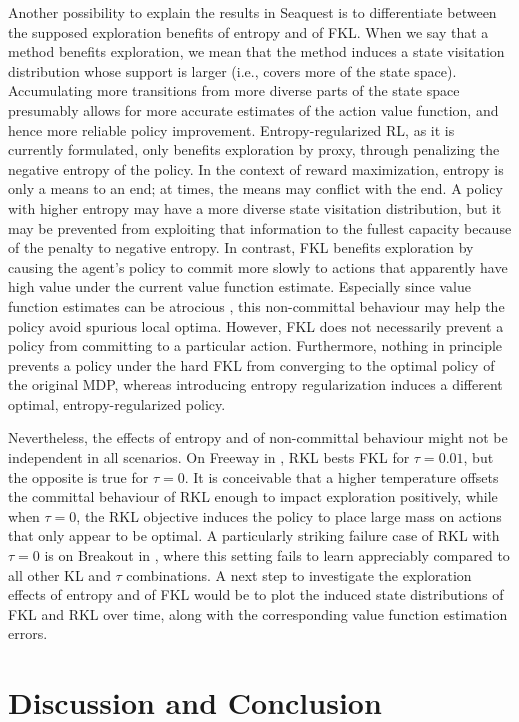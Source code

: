 \documentclass[twoside,11pt]{article}
\begin{document}
Another possibility to explain the results in Seaquest is to differentiate between the supposed exploration benefits of entropy and of FKL. When we say that a method benefits exploration, we mean that the method induces a state visitation distribution whose support is larger (i.e., covers more of the state space). Accumulating more transitions from more diverse parts of the state space presumably allows for more accurate estimates of the action value function, and hence more reliable policy improvement. Entropy-regularized RL, as it is currently formulated, only benefits exploration by proxy, through penalizing the negative entropy of the policy. In the context of reward maximization, entropy is only a means to an end; at times, the means may conflict with the end. A policy with higher entropy may have a more diverse state visitation distribution, but it may be prevented from exploiting that information to the fullest capacity because of the penalty to negative entropy. In contrast, FKL benefits exploration by causing the agent's policy to commit more slowly to actions that apparently have high value under the current value function estimate. Especially since value function estimates can be atrocious \citep{ilyas2018deep}, this non-committal behaviour may help the policy avoid spurious local optima. However, FKL does not necessarily prevent a policy from committing to a particular action. Furthermore, nothing in principle prevents a policy under the hard FKL from converging to the optimal policy of the original MDP, whereas introducing entropy regularization induces a different optimal, entropy-regularized policy. 

Nevertheless, the effects of entropy and of non-committal behaviour might not be independent in all scenarios. On Freeway in , RKL bests FKL for $\tau = 0.01$, but the opposite is true for $\tau = 0$. It is conceivable that a higher temperature offsets the committal behaviour of RKL enough to impact exploration positively, while when $\tau = 0$, the RKL objective induces the policy to place large mass on actions that only appear to be optimal. A particularly striking failure case of RKL with $\tau = 0$ is on Breakout in , where this setting fails to learn appreciably compared to all other KL and $\tau$ combinations. A next step to investigate the exploration effects of entropy and of FKL would be to plot the induced state distributions of FKL and RKL over time, along with the corresponding value function estimation errors. 

\section{Discussion and Conclusion} 
\end{document}
